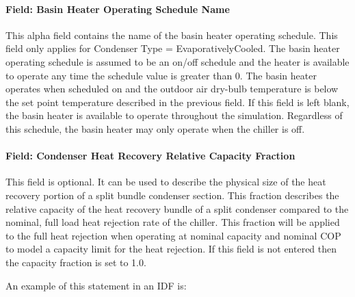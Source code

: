 \paragraph{Field: Basin Heater Operating Schedule Name}\label{field-basin-heater-operating-schedule-name-3-001}

This alpha field contains the name of the basin heater operating schedule. This field only applies for Condenser Type = EvaporativelyCooled. The basin heater operating schedule is assumed to be an on/off schedule and the heater is available to operate any time the schedule value is greater than 0. The basin heater operates when scheduled on and the outdoor air dry-bulb temperature is below the set point temperature described in the previous field. If this field is left blank, the basin heater is available to operate throughout the simulation. Regardless of this schedule, the basin heater may only operate when the chiller is off.

\paragraph{Field: Condenser Heat Recovery Relative Capacity Fraction}\label{field-engine-heat-recovery-fraction}

This field is optional. It can be used to describe the physical size of the heat recovery portion of a split bundle condenser section. This fraction describes the relative capacity of the heat recovery bundle of a split condenser compared to the nominal, full load heat rejection rate of the chiller. This fraction will be applied to the full heat rejection when operating at nominal capacity and nominal COP to model a capacity limit for the heat rejection. If this field is not entered then the capacity fraction is set to 1.0.

An example of this statement in an IDF is:

